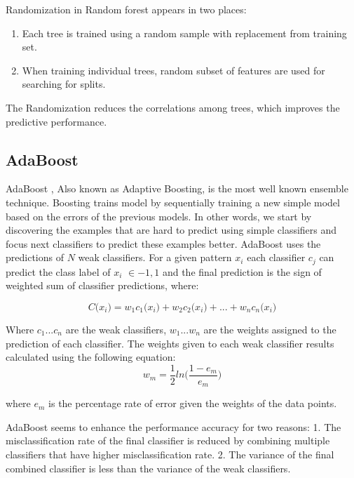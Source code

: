 \documentclass[runningheads,a4paper]{llncs}
\begin{document}
Randomization in Random forest appears in two places:
\begin{enumerate}
\item Each tree is trained using a random sample with replacement from training set.
\item When training individual trees, random subset of features are used for searching for splits. 
\end{enumerate}

The Randomization reduces the correlations among trees, which improves the predictive performance.

\subsection{AdaBoost}
AdaBoost \cite{Schapire2013}, Also known as Adaptive Boosting, is the most well known ensemble technique. Boosting trains model by sequentially training a new simple model based on the errors of the previous models. In other words, we start by discovering the examples that are hard to predict using simple classifiers and focus next classifiers to predict these examples better.
AdaBoost uses the predictions of $N$ weak classifiers. For a given pattern $x_i$ each classifier $c_j$ can predict the class label of $x_i$ $\in {-1,1}$ and the final prediction is the sign of weighted sum of classifier predictions, where:

\begin{equation}
C \bigl( x_i)=w_1c_1 \bigl (x_i)+w_2c_2 \bigl (x_i)+...+w_nc_n \bigl (x_i)
\end{equation}




Where $c_1 ... c_n$ are the weak classifiers, $w_1 ... w_n$ are the weights assigned to the prediction of each classifier. The weights given to each weak classifier results calculated using the following equation:
\begin{equation}
w_m=\frac{1}{2}ln \bigl ( \frac{1-e_m}{e_m}  )
\end{equation}

where $e_m$  is the percentage rate of error given the weights of the data points.

AdaBoost seems to enhance the performance accuracy for two reasons:
1. The misclassification rate of the final classifier is reduced by combining multiple classifiers that have higher misclassification rate.
2.  The variance of the final combined classifier is less than the variance of the weak classifiers.
\end{document}
